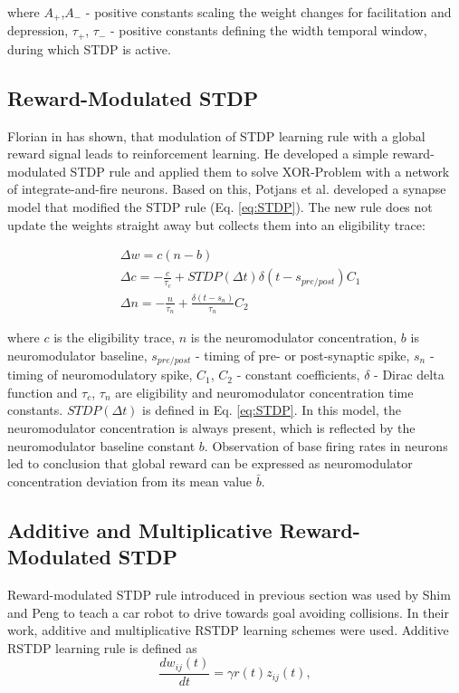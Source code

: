 where \(A_{+}\),\(A_{-}\) - positive constants scaling the weight changes for facilitation and depression, \(\tau_{+}\), \(\tau_{-}\) - positive constants defining the width temporal window, during which STDP is active.

\subsection{Reward-Modulated STDP}
Florian in \cite{15} has shown, that modulation of STDP learning rule with a global reward signal leads to reinforcement learning. He developed a simple reward-modulated STDP rule and applied them to solve XOR-Problem with a network of integrate-and-fire neurons. Based on this, Potjans et al. \cite{10} developed a synapse model that modified the STDP rule (Eq. \ref{eq:STDP}). The new rule does not update the weights straight away but collects them into an eligibility trace:

\begin{equation*}
	\begin{split} &
	\Delta w = c(n-b)\\&
	\Delta c = -\frac{c}{\tau_c} + STDP(\Delta t)\delta(t - s_{pre/post})C_1\\&
	\Delta n = -\frac{n}{\tau_n} +  \frac{\delta (t - s_n)}{\tau_n}C_2
	\end{split}	
	\label{RSTDP}
\end{equation*}

where \(c\) is the eligibility trace, \(n\) is the neuromodulator concentration, \(b\) is neuromodulator baseline, \(s_{pre/post}\) - timing of pre- or post-synaptic spike, \(s_n\) - timing of neuromodulatory spike, \(C_1\), \(C_2\) - constant coefficients, \(\delta\) - Dirac delta function and \(\tau_c\), \(\tau_n\) are eligibility and neuromodulator concentration time constants. \(STDP(\Delta t)\) is defined in Eq. \ref{eq:STDP}. In this model, the neuromodulator concentration is always present, which is reflected by the neuromodulator baseline constant \(b\). Observation of base firing rates in neurons led to conclusion that global reward can be expressed as neuromodulator concentration deviation from its mean value \(\bar{b}\). 

\subsection{Additive and Multiplicative Reward-Modulated STDP}\label{armmrm}
Reward-modulated STDP rule introduced in previous section was used by Shim and Peng \cite{16} to teach a car robot to drive towards goal avoiding collisions. In their work, additive and multiplicative RSTDP learning schemes were used. Additive RSTDP learning rule is defined as
\begin{equation*} 
	\frac{dw_{ij}(t)}{dt}=\gamma r(t)z_{ij}(t), 
\end{equation*}\label{eq:additiveSTDP}

